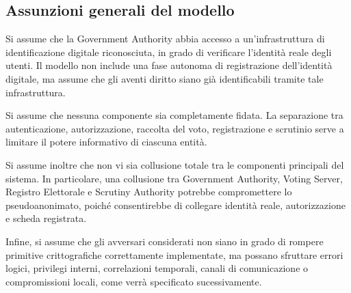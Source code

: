 \documentclass[a4paper,12pt]{article}
\begin{document}
\subsection{Assunzioni generali del modello}
    Si assume che la Government Authority abbia accesso a un'infrastruttura di
    identificazione digitale riconosciuta, in grado di verificare l'identità reale degli utenti. Il modello non
    include una fase autonoma di registrazione dell'identità digitale, ma assume che
    gli aventi diritto siano già identificabili tramite tale infrastruttura.
    
    Si assume che nessuna componente sia completamente fidata. La separazione tra autenticazione,
    autorizzazione, raccolta del voto, registrazione e scrutinio serve a limitare il potere informativo
    di ciascuna entità.

    Si assume inoltre che non vi sia collusione totale tra le componenti principali del sistema. In particolare,
    una collusione tra Government Authority, Voting Server, Registro Elettorale e Scrutiny Authority potrebbe
    compromettere lo pseudoanonimato, poiché consentirebbe di collegare identità reale, autorizzazione e scheda
    registrata.

    Infine, si assume che gli avversari considerati non siano in grado di rompere primitive crittografiche
    correttamente implementate, ma possano sfruttare errori logici, privilegi interni, correlazioni temporali,
    canali di comunicazione o compromissioni locali, come verrà specificato sucessivamente.
\end{document}
